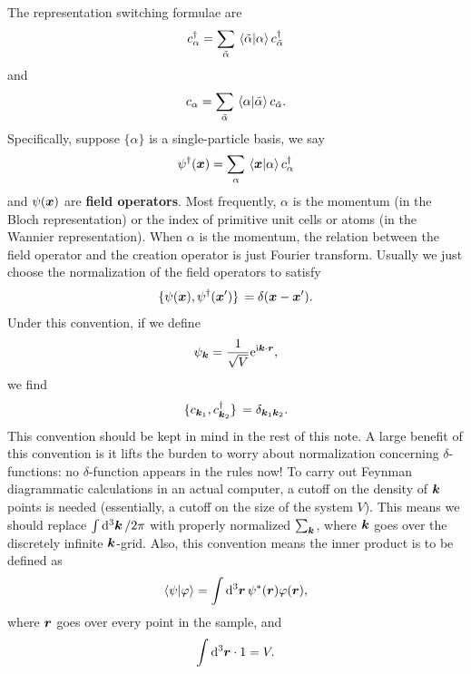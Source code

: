 \documentclass[hyperref, a4paper, 12pt]{report}
\newcommand*{\ii}{\mathrm{i}}
\newcommand*{\ee}{\mathrm{e}}
\newcommand*{\concept}[1]{{\textbf{#1}}}
\begin{document}
The representation switching formulae are 
\begin{equation}
    c_\alpha^\dagger = \sum_{\tilde{\alpha}} \braket*{\tilde{\alpha}}{\alpha} c_{\tilde{\alpha}}^\dagger
\end{equation}
and 
\begin{equation}
    c_\alpha = \sum_{\tilde{\alpha}} \braket*{\alpha}{\tilde{\alpha}} c_{\tilde{\alpha}}.
\end{equation}
Specifically, suppose $\{\alpha\}$ is a single-particle basis, 
we say 
\begin{equation}
    \psi^\dagger(\vb*{x}) = \sum_{\alpha} \braket*{\vb*{x}}{\alpha} c_\alpha^\dagger
\end{equation}
and $\psi(\vb*{x})$ are \concept{field operators}.
Most frequently, $\alpha$ is the momentum (in the Bloch representation) 
or the index of primitive unit cells or atoms (in the Wannier representation).
When $\alpha$ is the momentum, 
the relation between the field operator and the creation operator 
is just Fourier transform.
Usually we just choose the normalization of the field operators to satisfy 
\begin{equation}
    \acomm*{\psi(\vb*{x})}{\psi^\dagger(\vb*{x}')} = \delta(\vb*{x} - \vb*{x}').
\end{equation}
Under this convention, 
if we define 
\begin{equation}
    \psi_{\vb*{k}} = \frac{1}{\sqrt{V}} \ee^{\ii \vb*{k} \cdot \vb*{r}},
\end{equation}
we find 
\begin{equation}
    \acomm*{c_{\vb*{k}_1}}{c^\dagger_{\vb*{k}_2}} = \delta_{\vb*{k}_1 \vb*{k}_2}.
\end{equation}
This convention should be kept in mind in the rest of this note.
A large benefit of this convention 
is it lifts the burden to worry about normalization concerning $\delta$-functions:
no $\delta$-function appears in the rules now!
To carry out Feynman diagrammatic calculations in an actual computer,
a cutoff on the density of $\vb*{k}$ points is needed
(essentially, a cutoff on the size of the system $V$).
This means we should replace $\int \dd[3]{\vb*{k}} / 2\pi $
with properly normalized $\sum_{\vb*{k}}$,
where $\vb*{k}$ goes over the discretely infinite $\vb*{k}$-grid.
Also, this convention means the inner product is to be defined as 
\begin{equation}
    \braket{\psi}{\varphi} = \int \dd[3]{\vb*{r}} \psi^*(\vb*{r}) \varphi(\vb*{r}),
\end{equation}
where $\vb*{r}$ goes over every point in the sample, and 
\begin{equation}
    \int \dd[3]{\vb*{r}} \cdot 1 = V.   
\end{equation} 
\end{document}

